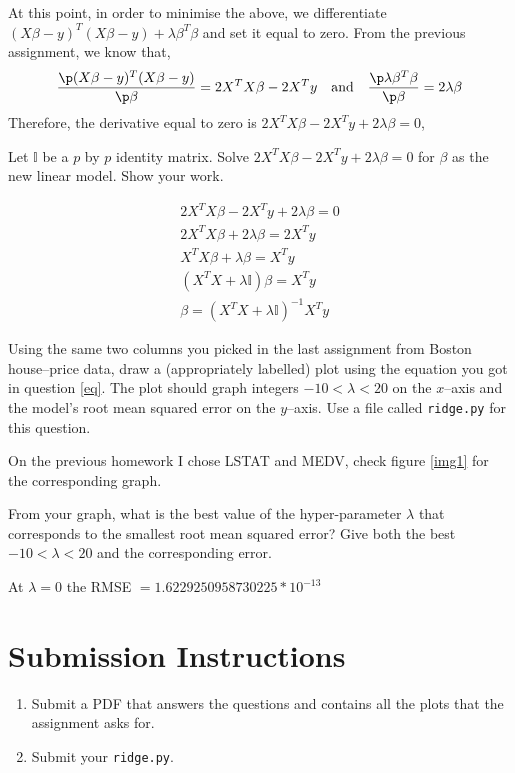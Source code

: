\documentclass{homework}
\begin{document}
At this point, in order to minimise the above, we differentiate
$(X\beta - y)^T(X\beta - y)+\lambda\beta^T\beta$ and set it equal to
zero. From the previous assignment, we know that,
\[
  \frac{\p (X\beta - y)^T(X\beta - y)}{\p \beta} = 2X^TX\beta - 2X^Ty
  \quad\text{and}\quad
  \frac{\p \lambda\beta^T\beta}{\p\beta} = 2\lambda \beta
\]
Therefore, the derivative equal to zero is
$2X^TX\beta - 2X^Ty + 2\lambda \beta = 0$,

\question\label{eq} Let $\mathbb{I}$ be a $p$ by $p$ identity
matrix. Solve $2X^TX\beta - 2X^Ty + 2\lambda \beta = 0$ for $\beta$ as
the new linear model. Show your work.

\begin{sol}
\begin{align*}
	2X^TX\beta - 2X^Ty + 2\lambda \beta = 0 \\
	2X^TX\beta + 2\lambda \beta = 2X^Ty \\
	X^TX\beta + \lambda \beta = X^Ty \\
	(X^TX + \lambda \mathbb{I}) \beta = X^Ty \\
	\beta = (X^TX + \lambda \mathbb{I})^{-1} X^Ty
\end{align*}
\end{sol}

\question Using the same two columns you picked in the last assignment
from Boston house--price data, draw a (appropriately labelled) plot
using the equation you got in question \ref{eq}. The plot should graph
integers $-10 < \lambda <20$ on the $x$--axis and the model's root
mean squared error on the $y$--axis. Use a file called
\texttt{ridge.py} for this question.

\begin{sol}
	On the previous homework I chose LSTAT and MEDV, check figure \ref{img1} for the corresponding graph.
\end{sol}

\question From your graph, what is the best value of the
hyper-parameter $\lambda$ that corresponds to the smallest root mean
squared error? Give both the best $-10 < \lambda <20$ and the
corresponding error.

\begin{sol}
	At $\lambda = 0$ the RMSE $= 1.6229250958730225 * 10^{-13}$
\end{sol}

\section*{Submission Instructions}

\begin{enumerate}
  \item Submit a PDF that answers the questions and contains all the
        plots that the assignment asks for.
  \item Submit your \texttt{ridge.py}.


\end{enumerate}
\end{document}
